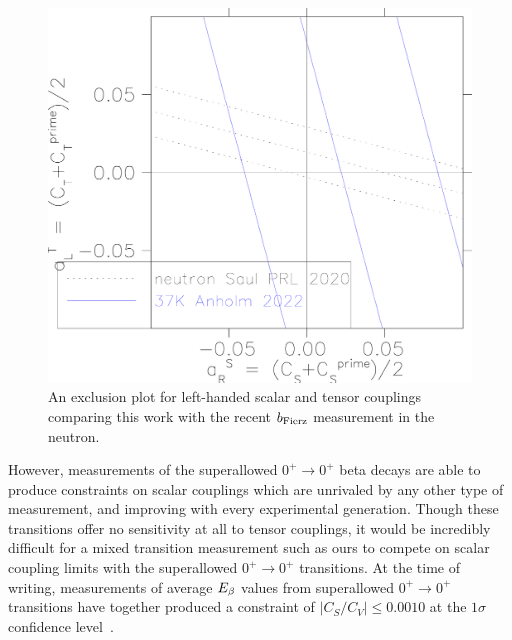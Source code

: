 \note{}
\begin{figure}[h!t!b!]
	\centering
	\includegraphics[width=.999\linewidth]{Figures/JB_exclusion.pdf}
	\caption[An exclusion plot for left-handed scalar and tensor couplings comparing this work with the recent $\bFierz$ measurement in the neutron]{An exclusion plot for left-handed scalar and tensor couplings comparing this work with the recent $\bFierz$ measurement in the neutron\cite{Saul2020}.}
	\label{fig:exclusionplotfromjohn}
\end{figure}

However, measurements of the superallowed $0^+ \rightarrow 0^+$ beta decays are able to produce constraints on scalar couplings which are unrivaled by any other type of measurement, and improving with every experimental generation.  Though these transitions offer no sensitivity at all to tensor couplings, it would be incredibly difficult for a mixed transition measurement such as ours to compete on scalar coupling limits with the superallowed $0^+ \rightarrow 0^+$ transitions.  
At the time of writing, measurements of average $E_{\beta}$ values from superallowed $0^+ \rightarrow 0^+$ transitions have together produced a constraint of \mbox{$\left| C_S / C_V \right| \leq 0.0010$} at the $1\sigma$ confidence level~\cite{HardyTownerSuperallowed2020}.
\note{}

